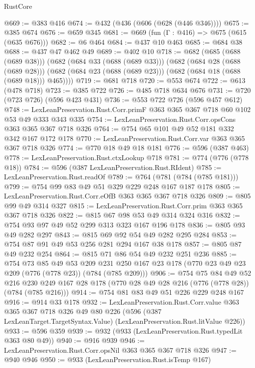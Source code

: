 \begin{lexlean}{RustCore}
\begin{coremodule}
@669 := @383 @416
@674 := @432 (@436 (@606 (@628 (@446 @346))))
@675 := @385 @674
@676 := @659 @345
@681 := @669 (fun (Γ : @416) => @675 (@615 (@635 @676)))
@682 := @6 @464
@684 := @437 @10 @463
@685 := @684 @38
@688 := @437 @47 @462 @49
@689 := @402 @10
@718 := @682
    (@685 (@688 (@689 @38)))
    (@682
      (@684 @33 (@688 (@689 @33)))
      (@682
        (@684 @28 (@688 (@689 @28)))
        (@682 (@684 @23 (@688 (@689 @23))) (@682 (@684 @18 (@688 (@689 @18))) @465))))
@719 := @681 @718
@720 := @553 @674
@722 := @613 (@478 @718)
@723 := @385 @722
@726 := @485 @718 @634 @676
@731 := @720 (@723 @726) (@596 @423 @431)
@736 := @553 @722 @726 (@596 @457 @612)
@748 := LexLeanPreservation.Rust.Corr.primF @363 @365 @367 @718 @60 @102 @53 @49 @333 @343 @335
@754 := LexLeanPreservation.Rust.Corr.opsCons @363 @365 @367 @718 @326
@764 := @754 @65 @101 @49 @52 @181 @332 @342 @167 @172 @178
@770 := LexLeanPreservation.Rust.Corr.var @363 @365 @367 @718 @326
@774 := @770 @18 @49 @18 @181
@776 := @596 (@387 @463)
@778 := LexLeanPreservation.Rust.ctxLookup @718
@781 := @774 (@776 (@778 @18))
@784 := @596 (@387 LexLeanPreservation.Rust.RIdent)
@785 := LexLeanPreservation.Rust.readOf
@789 := @764 (@781 (@784 (@785 @181)))
@799 := @754 @99 @83 @49 @51 @329 @229 @248 @167 @187 @178
@805 := LexLeanPreservation.Rust.Corr.eOfB @363 @365 @367 @718 @326
@809 := @805 @99 @49 @314 @327
@815 := LexLeanPreservation.Rust.Corr.prim @363 @365 @367 @718 @326
@822 := @815 @67 @98 @53 @49 @314 @324 @316
@832 := @754 @93 @97 @49 @52 @299 @313 @323 @167 @196 @178
@836 := @805 @93 @49 @282 @297
@843 := @815 @69 @92 @54 @49 @282 @295 @284
@853 := @754 @87 @91 @49 @53 @256 @281 @294 @167 @38 @178
@857 := @805 @87 @49 @232 @254
@864 := @815 @71 @86 @54 @49 @232 @251 @236
@885 := @754
    @73
    @85
    @49
    @53
    @209
    @231
    @250
    @167
    @23
    @178
    (@770 @23 @49 @23 @209 (@776 (@778 @23)) (@784 (@785 @209)))
@906 := @754
    @75
    @84
    @49
    @52
    @216
    @230
    @249
    @167
    @28
    @178
    (@770 @28 @49 @28 @216 (@776 (@778 @28)) (@784 (@785 @216)))
@914 := @754 @81 @83 @49 @51 @226 @229 @248 @167
@916 := @914 @33 @178
@932 := LexLeanPreservation.Rust.Corr.value
    @363
    @365
    @367
    @718
    @326
    @49
    @80
    @226
    (@596 (@387 LexLeanTarget.TargetSyntax.Value) (LexLeanPreservation.Rust.litValue @226))
@933 := @596 @359
@939 := @932 (@933 (LexLeanPreservation.Rust.typedLit @363 @80 @49))
@940 := @916 @939
@946 := LexLeanPreservation.Rust.Corr.opsNil @363 @365 @367 @718 @326
@947 := @940 @946
@950 := @933 (LexLeanPreservation.Rust.isTemp @167)

\end{coremodule}
\end{lexlean}
